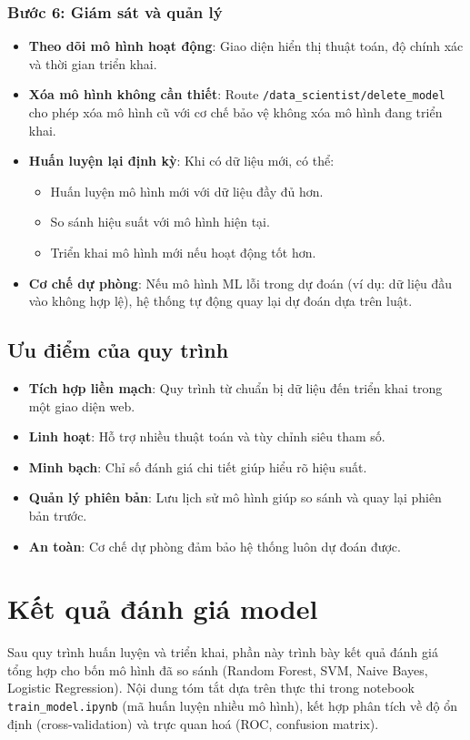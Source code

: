 ﻿\documentclass{article}
\begin{document}
\subsubsection{Bước 6: Giám sát và quản lý}
\begin{itemize}
    \item \textbf{Theo dõi mô hình hoạt động}: Giao diện hiển thị thuật toán, độ chính xác và thời gian triển khai.
    
    \item \textbf{Xóa mô hình không cần thiết}: Route \texttt{/data\_scientist/delete\_model} cho phép xóa mô hình cũ với cơ chế bảo vệ không xóa mô hình đang triển khai.
    
    \item \textbf{Huấn luyện lại định kỳ}: Khi có dữ liệu mới, có thể:
    \begin{itemize}
        \item Huấn luyện mô hình mới với dữ liệu đầy đủ hơn.
        \item So sánh hiệu suất với mô hình hiện tại.
        \item Triển khai mô hình mới nếu hoạt động tốt hơn.
    \end{itemize}
    
    \item \textbf{Cơ chế dự phòng}: Nếu mô hình ML lỗi trong dự đoán (ví dụ: dữ liệu đầu vào không hợp lệ), hệ thống tự động quay lại dự đoán dựa trên luật.
\end{itemize}

\subsection{Ưu điểm của quy trình}
\begin{itemize}
    \item \textbf{Tích hợp liền mạch}: Quy trình từ chuẩn bị dữ liệu đến triển khai trong một giao diện web.
    \item \textbf{Linh hoạt}: Hỗ trợ nhiều thuật toán và tùy chỉnh siêu tham số.
    \item \textbf{Minh bạch}: Chỉ số đánh giá chi tiết giúp hiểu rõ hiệu suất.
    \item \textbf{Quản lý phiên bản}: Lưu lịch sử mô hình giúp so sánh và quay lại phiên bản trước.
    \item \textbf{An toàn}: Cơ chế dự phòng đảm bảo hệ thống luôn dự đoán được.
\end{itemize}

\section{Kết quả đánh giá model}
Sau quy trình huấn luyện và triển khai, phần này trình bày kết quả đánh giá tổng hợp cho bốn mô hình đã so sánh (Random Forest, SVM, Naive Bayes, Logistic Regression). Nội dung tóm tắt dựa trên thực thi trong notebook \texttt{train\_model.ipynb} (mã huấn luyện nhiều mô hình), kết hợp phân tích về độ ổn định (cross-validation) và trực quan hoá (ROC, confusion matrix).
\end{document}
